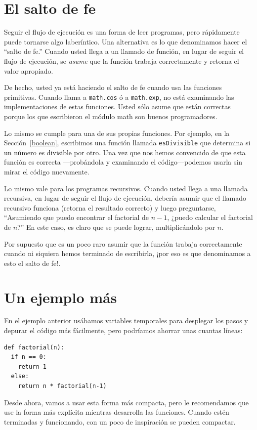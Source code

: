 \section{El salto de fe}

Seguir el flujo de ejecución es una forma de leer programas, pero
rápidamente puede tornarse algo laberíntico. Una alternativa es
lo que denominamos hacer el ``salto de fe.'' Cuando usted llega a un 
llamado de función, en lugar de seguir el flujo de ejecución, se
{\em asume} que la función trabaja correctamente y retorna el 
valor apropiado.

De hecho, usted ya está haciendo el salto de fe cuando usa
las funciones primitivas. Cuando llama a  \texttt{math.cos} ó a \texttt{math.exp},
no está examinando las implementaciones de estas funciones.
Usted sólo asume que están correctas porque los que escribieron el
módulo math son buenos programadores.

Lo mismo se cumple para una de sus propias funciones. Por ejemplo,
en la  Sección~\ref{boolean}, escribimos una función llamada \texttt{esDivisible}
que determina si un número es divisible por otro.  Una vez que
nos hemos convencido de que esta función es correcta ---probándola
y examinando el código---podemos usarla sin mirar el código nuevamente.


Lo mismo vale para los programas recursivos. Cuando usted llega a una
llamada recursiva, en lugar de seguir el flujo de ejecución, debería
asumir que el llamado recursivo funciona (retorna el resultado correcto)
y luego preguntarse, ``Asumiendo que puedo encontrar el factorial de $n-1$, 
¿puedo calcular el factorial de $n$?''  En este caso, es claro que
se puede lograr, multiplicándolo por $n$.

Por supuesto que es un poco raro asumir que la función trabaja correctamente
cuando ni siquiera hemos terminado de escribirla, ¡por eso es que denominamos
a esto el salto de fe!.


\section{Un ejemplo más}
\label{one more example}

En el ejemplo anterior usábamos variables  temporales para desplegar
los pasos y depurar el código más fácilmente, pero podríamos
ahorrar unas cuantas líneas:

\beforeverb
\begin{verbatim}
def factorial(n):
  if n == 0:
    return 1
  else:
    return n * factorial(n-1)
\end{verbatim}
\afterverb
%
Desde ahora, vamos a usar esta forma más compacta, pero le recomendamos
que use la forma más explícita mientras desarrolla las funciones.
Cuando estén terminadas y funcionando, con un poco de inspiración se pueden compactar.

